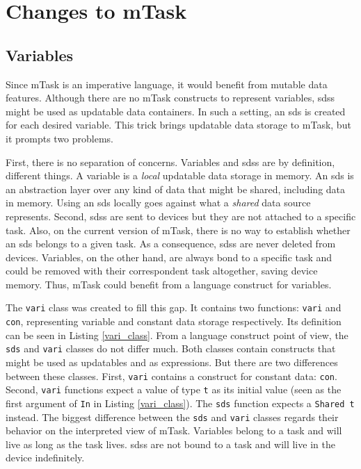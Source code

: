 
\section{Changes to mTask}
\subsection{Variables}

Since \gls{mTask} is an imperative language, it would benefit from mutable data features. Although there are no \gls{mTask} constructs to represent variables, \acp{sds} might be used as updatable data containers. In such a setting, an \ac{sds} is created for each desired variable. This trick brings updatable data storage to \gls{mTask}, but it prompts two problems. 

First, there is no separation of concerns. Variables and \acp{sds} are by definition, different things. A variable is a \textit{local} updatable data storage in memory. An \ac{sds} is an abstraction layer over any kind of data that might be shared, including data in memory. Using an \ac{sds} locally goes against what a \textit{shared} data source represents. Second, \acp{sds} are sent to devices but they are not attached to a specific task. Also, on the current version of mTask, there is no way to establish whether an \ac{sds} belongs to a given task. As a consequence, \acp{sds} are never deleted from devices. Variables, on the other hand, are always bond to a specific task and could be removed with their correspondent task altogether, saving device memory. Thus, \gls{mTask} could benefit from a language construct for variables. 

The \texttt{vari} class was created to fill this gap. It contains two functions: \texttt{vari} and \texttt{con}, representing variable and constant data storage respectively. Its definition can be seen in Listing \ref{vari_class}. From a language construct point of view, the \texttt{sds} and \texttt{vari} classes do not differ much. Both classes contain constructs that might be used as updatables and as expressions. But there are two differences between these classes. First, \texttt{vari} contains a construct for constant data: \texttt{con}. Second, \texttt{vari} functions expect a value of type \texttt{t} as its initial value (seen as the first argument of \texttt{In} in Listing \ref{vari_class}). The \texttt{sds} function expects a \texttt{Shared t} instead. The biggest difference between the \texttt{sds} and \texttt{vari} classes regards their behavior on the interpreted view of \gls{mTask}. Variables belong to a task and will live as long as the task lives. \acp{sds} are not bound to a task and will live in the device indefinitely. 


